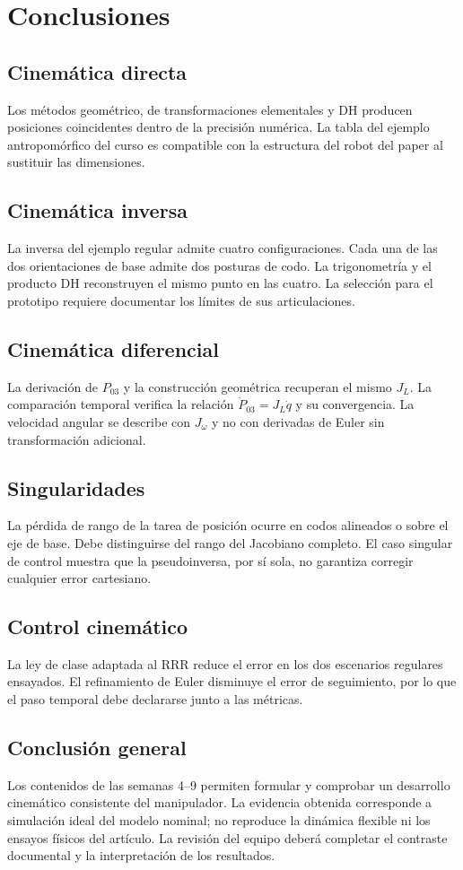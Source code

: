 \section{Conclusiones}
\subsection{Cinemática directa}
Los métodos geométrico, de transformaciones elementales y DH producen posiciones coincidentes dentro de la precisión numérica. La tabla del ejemplo antropomórfico del curso es compatible con la estructura del robot del paper al sustituir las dimensiones.
\subsection{Cinemática inversa}
La inversa del ejemplo regular admite cuatro configuraciones. Cada una de las dos orientaciones de base admite dos posturas de codo. La trigonometría y el producto DH reconstruyen el mismo punto en las cuatro. La selección para el prototipo requiere documentar los límites de sus articulaciones.
\subsection{Cinemática diferencial}
La derivación de $P_{03}$ y la construcción geométrica recuperan el mismo $J_L$. La comparación temporal verifica la relación $\dot P_{03}=J_L\dot q$ y su convergencia. La velocidad angular se describe con $J_\omega$ y no con derivadas de Euler sin transformación adicional.
\subsection{Singularidades}
La pérdida de rango de la tarea de posición ocurre en codos alineados o sobre el eje de base. Debe distinguirse del rango del Jacobiano completo. El caso singular de control muestra que la pseudoinversa, por sí sola, no garantiza corregir cualquier error cartesiano.
\subsection{Control cinemático}
La ley de clase adaptada al RRR reduce el error en los dos escenarios regulares ensayados. El refinamiento de Euler disminuye el error de seguimiento, por lo que el paso temporal debe declararse junto a las métricas.
\subsection{Conclusión general}
Los contenidos de las semanas 4--9 permiten formular y comprobar un desarrollo cinemático consistente del manipulador. La evidencia obtenida corresponde a simulación ideal del modelo nominal; no reproduce la dinámica flexible ni los ensayos físicos del artículo. La revisión del equipo deberá completar el contraste documental y la interpretación de los resultados.
